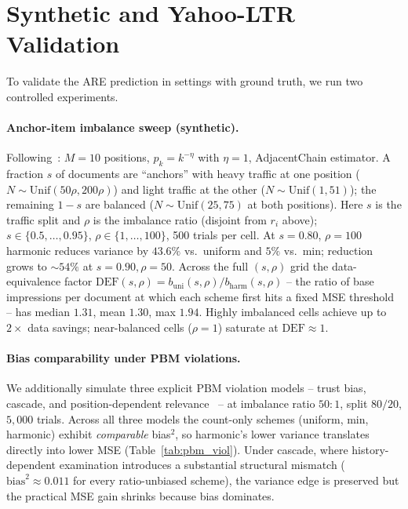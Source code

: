 \documentclass[sigconf]{acmart}
\begin{document}
\section{Synthetic and Yahoo-LTR Validation}
\label{sec:synth}

To validate the ARE prediction in settings with ground truth, we run two
controlled experiments.

\paragraph{Anchor-item imbalance sweep (synthetic).}
Following~\cite{agarwal2019estimating}: $M{=}10$ positions, $p_k=k^{-\eta}$
with $\eta=1$, AdjacentChain estimator. A fraction $s$ of documents are
``anchors'' with heavy traffic at one position
($N\sim\mathrm{Unif}(50\rho,200\rho)$) and light traffic at the other
($N\sim\mathrm{Unif}(1,51)$); the remaining $1-s$ are balanced
($N\sim\mathrm{Unif}(25,75)$ at both positions). Here $s$ is the
traffic split and $\rho$ is the imbalance ratio (disjoint from $r_i$
above);
$s\in\{0.5,\ldots,0.95\}$, $\rho\in\{1,\ldots,100\}$, 500 trials per
cell. At $s=0.80$, $\rho=100$ harmonic reduces variance by $43.6\%$
vs.\ uniform and $5\%$ vs.\ min; reduction grows to $\sim 54\%$ at
$s=0.90,\rho=50$. Across the full $(s,\rho)$ grid the data-equivalence
factor $\mathrm{DEF}(s,\rho)=b_{\mathrm{uni}}(s,\rho)/b_{\mathrm{harm}}(s,\rho)$
-- the ratio of base impressions per document at which each scheme
first hits a fixed MSE threshold -- has median $1.31$, mean $1.30$,
max $1.94$. Highly imbalanced cells achieve up to $2\times$ data
savings; near-balanced cells ($\rho=1$) saturate at
$\mathrm{DEF}\approx 1$.

\paragraph{Bias comparability under PBM violations.}
We additionally simulate three explicit PBM violation models -- trust
bias, cascade, and position-dependent
relevance~\cite{craswell2008experimental,agarwal2019estimating} -- at
imbalance ratio $50{:}1$, split $80/20$, $5{,}000$ trials. Across all
three models the count-only schemes (uniform, min, harmonic) exhibit
\emph{comparable} bias$^2$, so harmonic's lower variance translates
directly into lower MSE (Table~\ref{tab:pbm_viol}). Under cascade, where
history-dependent examination introduces a substantial structural mismatch
($\mathrm{bias}^2\approx 0.011$ for every ratio-unbiased scheme), the
variance edge is preserved but the practical MSE gain shrinks because
bias dominates.
\end{document}
